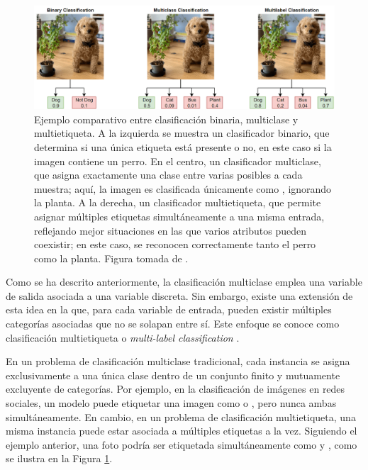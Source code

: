 \begin{figure}[htb]
    \includegraphics[width=\linewidth]{figures/2_theory/multilabel_example.png}
    \caption[Ejemplo comparativo entre clasificación binaria, multiclase y multietiqueta]{Ejemplo comparativo entre clasificación binaria, multiclase y multietiqueta. A la izquierda se muestra un clasificador binario, que determina si una única etiqueta está presente o no, en este caso si la imagen contiene un perro. En el centro, un clasificador multiclase, que asigna exactamente una clase entre varias posibles a cada muestra; aquí, la imagen es clasificada únicamente como , ignorando la planta. A la derecha, un clasificador multietiqueta, que permite asignar múltiples etiquetas simultáneamente a una misma entrada, reflejando mejor situaciones en las que varios atributos pueden coexistir; en este caso, se reconocen correctamente tanto el perro como la planta. Figura tomada de \cite{noauthor_multilabel_nodate}.}
    \label{multilabel_example}
\end{figure}

Como se ha descrito anteriormente, la clasificación multiclase emplea una variable de salida asociada a una variable discreta. Sin embargo, existe una extensión de esta idea en la que, para cada variable de entrada, pueden existir múltiples categorías asociadas que no se solapan entre sí. Este enfoque se conoce como clasificación multietiqueta o \textit{multi-label classification} \cite{tarekegn_deep_2024}.

En un problema de clasificación multiclase tradicional, cada instancia se asigna exclusivamente a una única clase dentro de un conjunto finito y mutuamente excluyente de categorías. Por ejemplo, en la clasificación de imágenes en redes sociales, un modelo puede etiquetar una imagen como  o , pero nunca ambas simultáneamente. En cambio, en un problema de clasificación multietiqueta, una misma instancia puede estar asociada a múltiples etiquetas a la vez. Siguiendo el ejemplo anterior, una foto podría ser etiquetada simultáneamente como  y , como se ilustra en la Figura \ref{multilabel_example}.

